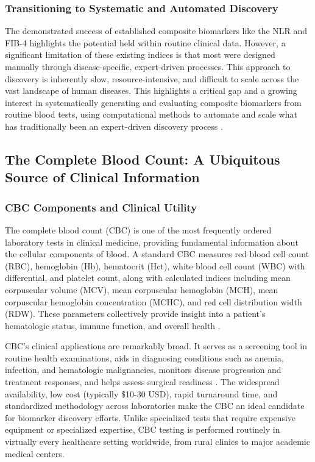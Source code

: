 \documentclass[12pt,a4paper]{article}
\begin{document}
\subsubsection{Transitioning to Systematic and Automated Discovery}

The demonstrated success of established composite biomarkers like the NLR and FIB-4 highlights the potential held within routine clinical data. However, a significant limitation of these existing indices is that most were designed manually through disease-specific, expert-driven processes. This approach to discovery is inherently slow, resource-intensive, and difficult to scale across the vast landscape of human diseases. This highlights a critical gap and a growing interest in systematically generating and evaluating composite biomarkers from routine blood tests, using computational methods to automate and scale what has traditionally been an expert-driven discovery process \cite{ref21,ref22}.

\subsection{The Complete Blood Count: A Ubiquitous Source of Clinical Information}

\subsubsection{CBC Components and Clinical Utility}

The complete blood count (CBC) is one of the most frequently ordered laboratory tests in clinical medicine, providing fundamental information about the cellular components of blood. A standard CBC measures red blood cell count (RBC), hemoglobin (Hb), hematocrit (Hct), white blood cell count (WBC) with differential, and platelet count, along with calculated indices including mean corpuscular volume (MCV), mean corpuscular hemoglobin (MCH), mean corpuscular hemoglobin concentration (MCHC), and red cell distribution width (RDW). These parameters collectively provide insight into a patient's hematologic status, immune function, and overall health \cite{ref9}.

CBC's clinical applications are remarkably broad. It serves as a screening tool in routine health examinations, aids in diagnosing conditions such as anemia, infection, and hematologic malignancies, monitors disease progression and treatment responses, and helps assess surgical readiness \cite{ref9}. The widespread availability, low cost (typically \$10-30 USD), rapid turnaround time, and standardized methodology across laboratories make the CBC an ideal candidate for biomarker discovery efforts. Unlike specialized tests that require expensive equipment or specialized expertise, CBC testing is performed routinely in virtually every healthcare setting worldwide, from rural clinics to major academic medical centers.
\end{document}
